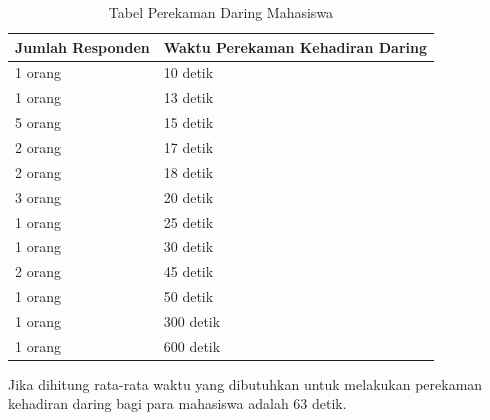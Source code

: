 \begin{enumerate}
\begin{table}[ht]
		\caption{Tabel Perekaman Daring Mahasiswa}
		\centering
		\begin{tabular}{|p{4cm} |p{7cm}|}\hline
			Jumlah Responden &  Waktu Perekaman Kehadiran Daring \\ \hline     
			1 orang &  10 detik\\ \hline 
			1 orang &  13 detik\\ \hline 
			5 orang &  15 detik\\ \hline 
			2 orang &  17 detik\\ \hline 
			2 orang &  18 detik\\ \hline 
			3 orang &  20 detik\\ \hline
			1 orang &  25 detik\\ \hline 
			1 orang &  30 detik\\ \hline 
			2 orang &  45 detik\\ \hline
			1 orang &  50 detik\\ \hline 
			1 orang &  300 detik\\ \hline 
			1 orang &  600 detik\\ \hline		
		\end{tabular}
		\label{tab:daringMahasiswa}
	\end{table}
	Jika dihitung rata-rata waktu yang dibutuhkan untuk melakukan perekaman kehadiran daring bagi para mahasiswa adalah 63 detik.
	

\end{enumerate}
